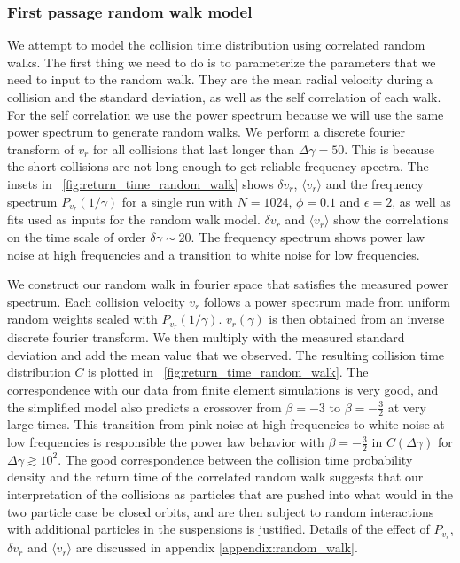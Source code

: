 \documentclass[aps,pre,twocolumn,letterpaper,floatfix,showpacs]{revtex4}
\begin{document}
\subsubsection{First passage random walk model}
We attempt to model the collision time distribution using correlated random walks. The first thing we need to do is to parameterize the parameters that we need to input to the random walk. They are the mean radial velocity during a collision and the standard deviation, as well as the self correlation of each walk. For the self correlation we use the power spectrum because we will use the same power spectrum to generate random walks. We perform a discrete fourier transform of $v_r$ for all collisions that last longer than $\Delta \gamma = 50$. This is because the short collisions are not long enough to get reliable frequency spectra. The insets in \figurename~\ref{fig:return_time_random_walk} shows $\delta v_r$, $\langle v_r \rangle$ and the frequency spectrum $P_{v_r} (1/\gamma)$ for a single run with $N=1024$, $\phi = 0.1$ and $\epsilon = 2$, as well as fits used as inputs for the random walk model. $\delta v_r$ and $\langle v_r \rangle$ show the correlations on the time scale of order $\delta \gamma \sim 20$. The frequency spectrum shows power law noise at high frequencies and a transition to white noise for low frequencies. 

We construct our random walk in fourier space that satisfies the measured power spectrum. Each collision velocity $v_r$ follows a power spectrum made from uniform random weights scaled with $P_{v_r} (1/\gamma)$. $v_r(\gamma)$ is then obtained from an inverse discrete fourier transform. We then multiply with the measured standard deviation and add the mean value that we observed. The resulting collision time distribution $C$ is plotted in \figurename~\ref{fig:return_time_random_walk}. The correspondence with our data from finite element simulations is very good, and the simplified model also predicts a crossover from $\beta = -3$ to $\beta = -\frac{3}{2}$ at very large times. This transition from pink noise at high frequencies to white noise at low frequencies is responsible the power law behavior with $\beta = -\frac{3}{2}$ in $C(\Delta \gamma)$ for $\Delta \gamma \gtrsim 10^2$. The good correspondence between the collision time probability density and the return time of the correlated random walk suggests that our interpretation of the collisions as particles that are pushed into what would in the two particle case be closed orbits, and are then subject to random interactions with additional particles in the suspensions is justified. Details of the effect of $P_{v_r}$, $\delta v_r$ and $\langle v_r \rangle$ are discussed in appendix \ref{appendix:random_walk}.
\end{document}
